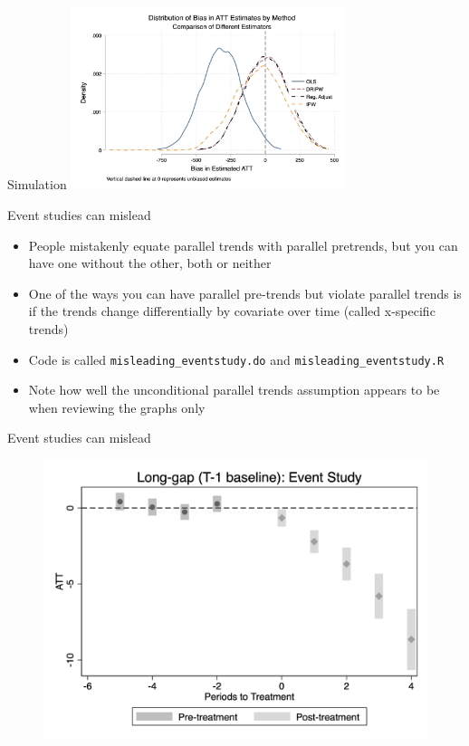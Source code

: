 \documentclass{beamer}
\begin{document}
\begin{frame}{Simulation}
    \centering
    \includegraphics[width=0.6\textwidth]{./lecture_includes/covariates.jpg}
\end{frame}



\begin{frame}{Event studies can mislead}

\begin{itemize}

\item People mistakenly equate parallel trends with parallel pretrends, but you can have one without the other, both or neither
\item One of the ways you can have parallel pre-trends but violate parallel trends is if the trends change differentially by covariate over time (called x-specific trends)
\item Code is called \texttt{misleading_eventstudy.do} and \texttt{misleading_eventstudy.R}
\item Note how well the unconditional parallel trends assumption appears to be when reviewing the graphs only
\end{itemize}

\end{frame}

\begin{frame}{Event studies can mislead}

\begin{figure}
    \centering
    \includegraphics[height=0.75\textheight]{./lecture_includes/es_flawed.png}
\end{figure}

\end{frame}
\end{document}
